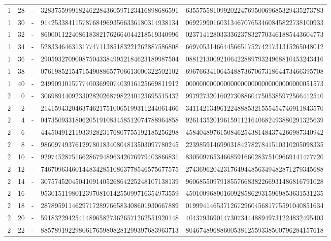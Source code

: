 \begin{longtable}{rrrll}
1 & 28 & - & 3283755999182462284360597123416898686591 & 6355755810992022476950069685329435273783 \\
1 & 30 & - & 9142533841157876849693566336180314938134 & 0692799016031346707653460845822738100933 \\
1 & 32 & - & 8600011224086183821762664044218519340996 & 0237141280333362378327703461885443604773 \\
1 & 34 & - & 5283346463131774711385183221262887586808 & 6697053146644566517527421731315265048012 \\
1 & 36 & - & 2905932709008750433849952184623189987504 & 0881213009210642288979324968810453243416 \\
1 & 38 & - & 0761985215471549088657706613000322502102 & 6967663410645488736706731864473466395708 \\
1 & 40 & - & 2499091015777400369907403916125669811912 & 0000000000000000000000000000000000051573 \\
2 & 0 & - & 3069894409233028202687982240123695515432 & 9979273201602730886047505385972566412540 \\
2 & 2 & - & 2141594320463746217510065199311244061466 & 3411421349612248885321555454746911843570 \\
2 & 4 & - & 0473509331806205191083458512074788964858 & 9261435201961591121640682493880291325639 \\
2 & 6 & - & 4445049121193392823176807755192185256298 & 4584048976150846254381484374266987340942 \\
2 & 8 & - & 9860974937612978018340804813503097780245 & 2239859146990318427827841510310205098335 \\
2 & 10 & - & 9297452875166286794896342676979403866831 & 8305097653466859166028375109669141477720 \\
2 & 12 & - & 7467096346014483428510863778546575677575 & 2743696204231764944856349482871279345688 \\
2 & 14 & - & 3075745204504109140526864225248107138139 & 9606855097918557668382266931486816791028 \\
2 & 16 & - & 9530151198012397081014255099716354973559 & 4501009689016092858629315969853631531235 \\
2 & 18 & - & 2878959114629717289766583408601930667889 & 0199941465371267296045681775591040851634 \\
2 & 20 & - & 5918322942541489658273626571262551920148 & 4043793690147307344488949731224832495403 \\
2 & 22 & - & 8857891922980617659808281299397683963713 & 8046748968860053812559338500796284157618 \\

\end{longtable}
